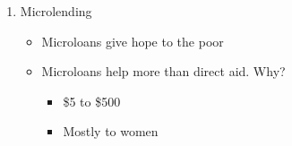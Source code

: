 \documentclass[12pt]{article}
\begin{document}
\begin{enumerate}
\begin{itemize}
    \end{itemize}

  \item Microlending

    \begin{itemize}

      \item Microloans give hope to the poor

      \item Microloans help more than direct aid. Why?

        \begin{itemize}

          \item \$5 to \$500

          \item Mostly to women

        \end{itemize}

    \end{itemize}

\end{enumerate}
\end{document}

